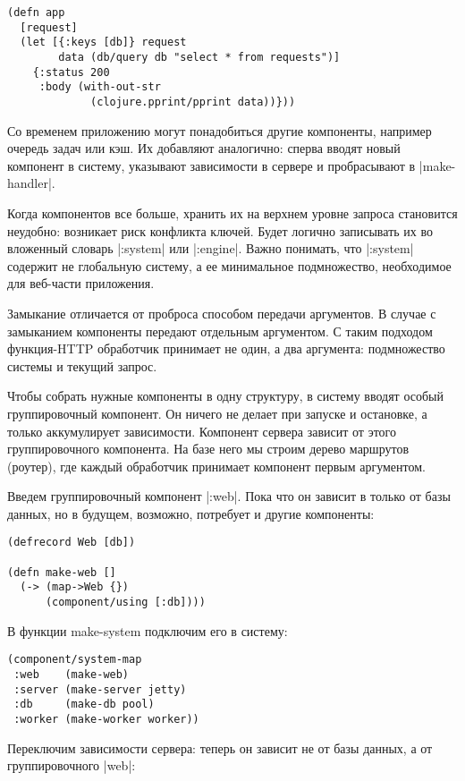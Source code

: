 \begin{verbatim}
(defn app
  [request]
  (let [{:keys [db]} request
        data (db/query db "select * from requests")]
    {:status 200
     :body (with-out-str
             (clojure.pprint/pprint data))}))
\end{verbatim}

Со временем приложению могут понадобиться другие компоненты, например очередь
задач или кэш. Их добавляют аналогично: сперва вводят новый компонент в систему,
указывают зависимости в сервере и пробрасывают в \spverb|make-handler|.

Когда компонентов все больше, хранить их на верхнем уровне запроса становится
неудобно: возникает риск конфликта ключей. Будет логично записывать их во
вложенный словарь \spverb|:system| или \spverb|:engine|. Важно понимать, что \spverb|:system|
содержит не глобальную систему, а ее минимальное подмножество, необходимое для
веб-части приложения.

Замыкание отличается от проброса способом передачи аргументов. В случае с
замыканием компоненты передают отдельным аргументом. С таким подходом
функция-HTTP обработчик принимает не один, а два аргумента: подмножество системы
и текущий запрос.

Чтобы собрать нужные компоненты в одну структуру, в систему вводят особый
группировочный компонент. Он ничего не делает при запуске и остановке, а только
аккумулирует зависимости. Компонент сервера зависит от этого группировочного
компонента. На базе него мы строим дерево маршрутов (роутер), где каждый
обработчик принимает компонент первым аргументом.

Введем группировочный компонент \spverb|:web|. Пока что он зависит в только от базы
данных, но в будущем, возможно, потребует и другие компоненты:

\begin{verbatim}
(defrecord Web [db])

(defn make-web []
  (-> (map->Web {})
      (component/using [:db])))
\end{verbatim}

В функции make-system подключим его в систему:

\begin{verbatim}
(component/system-map
 :web    (make-web)
 :server (make-server jetty)
 :db     (make-db pool)
 :worker (make-worker worker))
\end{verbatim}

Переключим зависимости сервера: теперь он зависит не от базы данных, а от
группировочного \spverb|web|:

